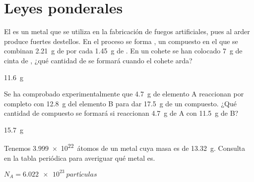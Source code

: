 \section{Leyes ponderales}

\begin{exercise}[
    tags    = {termodinámica, entalpía, entalpia de reacción, calor},
    topics  = {química, termoquímica, termodinámica},
    source  = {FQ 1B SAN 2015, p42, e24},
  ]
  El  es un metal que se utiliza en la fabricación
  de fuegos artificiales, pues al arder produce fuertes
  destellos. En el proceso se forma , un compuesto
  en el que se combinan \SI{2.21}{\gram} de  por cada \SI{1.45}{\gram} de . En un cohete se han colocado \SI{7}{\gram} de cinta de , ¿qué cantidad de  se formará cuando el cohete arda?
\end{exercise}

\begin{solution}
  \SI{11.6}{\gram}
\end{solution}




\begin{exercise}[
    tags    = {termodinámica, entalpía, entalpia de reacción, calor},
    topics  = {química, termoquímica, termodinámica},
    source  = {FQ 1B OXF 2015, p42, e23},
  ]
  Se ha comprobado experimentalmente que \SI{4.7}{g} de elemento A reaccionan por completo con \SI{12.8}{\gram} del elemento B para dar \SI{17.5}{\gram} de un compuesto. ¿Qué cantidad de compuesto se formará si reaccionan \SI{4.7}{\gram} de A con \SI{11.5}{\gram} de B?
\end{exercise}

\begin{solution}
  \SI{15.7}{\gram}
\end{solution}




\begin{exercise}[
    tags    = {termodinámica, entalpía, entalpia de reacción, calor},
    topics  = {química, termoquímica, termodinámica},
    source  = {FQ 1B SAN 2015, p43, e34},
  ]
  Tenemos \SI{3.999e22}{átomos} de un metal cuya masa es de \SI{13.32}{\gram}. Consulta en la tabla periódica para averiguar
  qué metal es.

  \begin{gexdatos}
    \( N_A = \SI{6.022e23}{partículas}\)
  \end{gexdatos}
\end{exercise}

